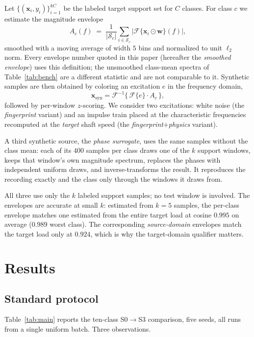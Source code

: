 \documentclass[journal]{IEEEtran}
\begin{document}
Let $\{(\mathbf{x}_i,y_i)\}_{i=1}^{kC}$ be the labeled target support set for
$C$ classes. For class $c$ we estimate the magnitude envelope
\begin{equation}
A_c(f) \;=\; \frac{1}{|\mathcal{S}_c|}\sum_{i \in \mathcal{S}_c}
\bigl|\mathcal{F}\{ \mathbf{x}_i \odot \mathbf{w} \}(f)\bigr|,
\end{equation}
smoothed with a moving average of width $5$ bins and normalized to unit $\ell_2$
norm. Every envelope number quoted in this paper (hereafter the \emph{smoothed
envelope}) uses this definition; the unsmoothed class-mean spectra of
Table~\ref{tab:bench} are a different statistic and are not comparable to it.
Synthetic samples are then obtained by coloring an excitation $e$ in the
frequency domain,
\begin{equation}
\mathbf{x}_{\text{syn}} = \mathcal{F}^{-1}\bigl\{\, \mathcal{F}\{e\} \cdot A_c \,\bigr\},
\end{equation}
followed by per-window $z$-scoring. We consider two excitations: white noise
(the \emph{fingerprint} variant) and an impulse train placed at the
characteristic frequencies recomputed at the \emph{target} shaft speed
(the \emph{fingerprint$+$physics} variant).

A third synthetic source, the \emph{phase surrogate}, uses the same samples
without the class mean: each of its $400$ samples per class draws one of the
$k$ support windows, keeps that window's own magnitude spectrum, replaces the
phases with independent uniform draws, and inverse-transforms the result. It
reproduces the recording exactly and the class only through the windows it
draws from.

All three use only the $k$ labeled support samples; no test window is
involved. The envelopes are accurate at small $k$: estimated from $k=5$
samples, the per-class envelope matches one estimated from the entire target
load at cosine $0.995$ on average ($0.989$ worst class). The corresponding
\emph{source-domain} envelopes match the target load only at $0.924$, which is
why the target-domain qualifier matters.

\section{Results}
\label{sec:results}

\subsection{Standard protocol}
Table~\ref{tab:main} reports the ten-class S0$\rightarrow$S3 comparison,
five seeds, all runs from a single uniform batch. Three observations.
\end{document}

